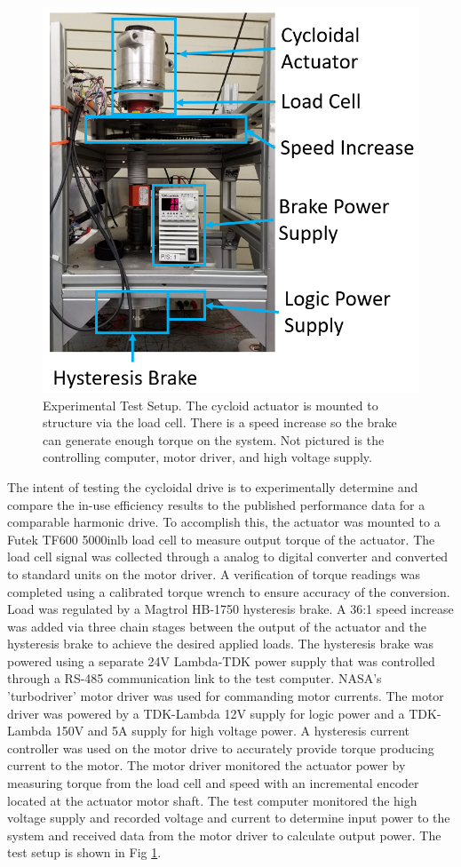 \begin{figure}[!b]
   \centering
   \includegraphics[width=0.75\linewidth]{images/test_stand}
   \caption{Experimental Test Setup.
   The cycloid actuator is mounted to structure via the load cell.
   There is a speed increase so the brake can generate enough torque on the system.
   Not pictured is the controlling computer, motor driver, and high voltage supply.}
   \label{test_setup}
\end{figure}

The intent of testing the cycloidal drive is to experimentally determine and compare the in-use efficiency results to the published performance data for a comparable harmonic drive.
To accomplish this, the actuator was mounted to a Futek TF600 5000inlb load cell to measure output torque of the actuator.
The load cell signal was collected through a analog to digital converter and converted to standard units on the motor driver.
A verification of torque readings was completed using a calibrated torque wrench to ensure accuracy of the conversion.
Load was regulated by a Magtrol HB-1750 hysteresis brake.
A 36:1 speed increase was added via three chain stages between the output of the actuator and the hysteresis brake to achieve the desired applied loads.
The hysteresis brake was powered using a separate 24V Lambda-TDK power supply that was controlled through a RS-485 communication link to the test computer.
NASA's 'turbodriver' motor driver was used for commanding motor currents.
The motor driver was powered by a TDK-Lambda 12V supply for logic power and a TDK-Lambda 150V and 5A supply for high voltage power.
A hysteresis current controller was used on the motor drive to accurately provide torque producing current to the motor.
The motor driver monitored the actuator power by measuring torque from the load cell and speed with an incremental encoder located at the actuator motor shaft.
The test computer monitored the high voltage supply and recorded voltage and current to determine input power to the system and received data from the motor driver to calculate output power.
The test setup is shown in Fig \ref{test_setup}.

